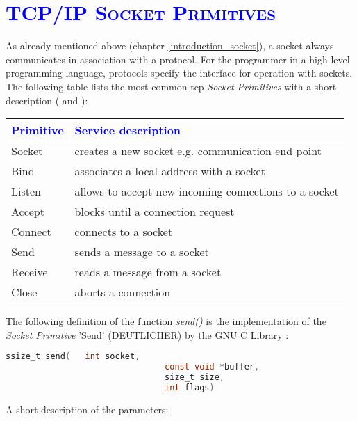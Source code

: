 \documentclass[xcolor=dvipsnames]{article}
\begin{document}
\section{\scshape{\textcolor{blue}{TCP/IP Socket Primitives}}} \label{socket_primitives}

As already mentioned above (chapter \ref{introduction_socket}), a socket always communicates in association with a protocol. For the programmer in a high-level programming language, protocols specify the interface for operation with sockets.\\

\noindent The following table lists the most common \gls{tcp} \textit{Socket Primitives} with a short description (\cite{IBM_Anupama} and \cite[p. 142, ch. 4.3.1]{tanenbaum}):\\

\begin{center}
\begin{tabular}{ | l | l | } 
\hline
\textcolor{blue}{Primitive} & \textcolor{blue}{Service description}\\
\hline
Socket & creates a new socket e.g. communication end point\\
Bind & associates a local address with a socket\\
Listen & allows to accept new incoming connections to a socket\\
Accept & blocks until a connection request\\
Connect & connects to a socket\\
Send & sends a message to a socket\\
Receive & reads a message from a socket\\
Close & aborts a connection\\
\hline
\end{tabular}
\end{center}
\label{tab:tcp_primitives}

\noindent The following definition of the function \textit{send()} is the implementation of the \textit{Socket Primitive} 'Send' (DEUTLICHER) by the GNU C Library \cite[p. 457, ch. 16.9.5.1]{GNU_C_library_manual}:

\begin{lstlisting}[language=C, numbers=none]
ssize_t send(  	int socket, 
								const void *buffer, 
								size_t size, 
								int flags)
\end{lstlisting}

\noindent A short description of the parameters:
\end{document}
